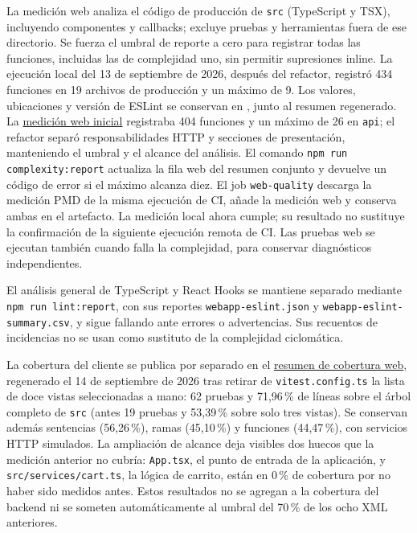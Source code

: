 \documentclass[12pt,a4paper]{article}
\begin{document}
La medición web analiza el código de producción de \texttt{src} (TypeScript y TSX), incluyendo componentes y callbacks; excluye pruebas y herramientas fuera de ese directorio. Se fuerza el umbral de reporte a cero para registrar todas las funciones, incluidas las de complejidad uno, sin permitir supresiones inline. La ejecución local del 13 de septiembre de 2026, después del refactor, registró 434 funciones en 19 archivos de producción y un máximo de 9. Los valores, ubicaciones y versión de ESLint se conservan en , junto al resumen regenerado. La \href{https://github.com/JoseLozanoMorales/TiendaTech/blob/f6de7608d79b746d11a4c14440c89086d765b279/docs/experimentos/resultados/iso25010/complejidad/webapp-complexity.json}{medición web inicial} registraba 404 funciones y un máximo de 26 en \texttt{api}; el refactor separó responsabilidades HTTP y secciones de presentación, manteniendo el umbral y el alcance del análisis. El comando \texttt{npm run complexity:report} actualiza la fila web del resumen conjunto y devuelve un código de error si el máximo alcanza diez. El job \texttt{web-quality} descarga la medición PMD de la misma ejecución de CI, añade la medición web y conserva ambas en el artefacto. La medición local ahora cumple; su resultado no sustituye la confirmación de la siguiente ejecución remota de CI. Las pruebas web se ejecutan también cuando falla la complejidad, para conservar diagnósticos independientes.

El análisis general de TypeScript y React Hooks se mantiene separado mediante \texttt{npm run lint:report}, con sus reportes \texttt{webapp-eslint.json} y \texttt{webapp-eslint-summary.csv}, y sigue fallando ante errores o advertencias. Sus recuentos de incidencias no se usan como sustituto de la complejidad ciclomática.


La cobertura del cliente se publica por separado en el \href{https://github.com/JoseLozanoMorales/TiendaTech/blob/ef374a09d203fc56cd21d08d7b7922ce9f42016c/docs/evidencias/cobertura/web/coverage-summary.json}{resumen de cobertura web}, regenerado el 14 de septiembre de 2026 tras retirar de \texttt{vitest.config.ts} la lista de doce vistas seleccionadas a mano: 62 pruebas y 71,96\,\% de líneas sobre el árbol completo de \texttt{src} (antes 19 pruebas y 53,39\,\% sobre solo tres vistas). Se conservan además sentencias (56,26\,\%), ramas (45,10\,\%) y funciones (44,47\,\%), con servicios HTTP simulados. La ampliación de alcance deja visibles dos huecos que la medición anterior no cubría: \texttt{App.tsx}, el punto de entrada de la aplicación, y \texttt{src/services/cart.ts}, la lógica de carrito, están en 0\,\% de cobertura por no haber sido medidos antes. Estos resultados no se agregan a la cobertura del backend ni se someten automáticamente al umbral del 70\,\% de los ocho XML anteriores.
\end{document}
